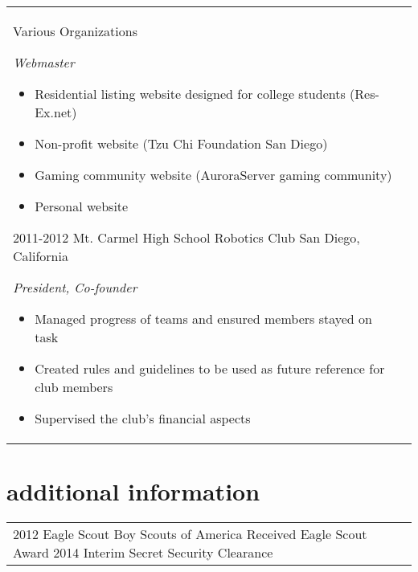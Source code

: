 \documentclass[print]{friggeri-cv} %
\makeatletter
\renewenvironment{entrylist}{%
	\par\begin{tabular*}{\textwidth}{@{\extracolsep{\fill}}ll}
	}{%
\end{tabular*}\par
}
\makeatother
\begin{document}
\begin{entrylist}
\entry
{ }
{Various Organizations}
{ }
{\emph{Webmaster}
\begin{itemize}
\item Residential listing website designed for college students (Res-Ex.net)
\item Non-profit website (Tzu Chi Foundation San Diego)
\item Gaming community website (AuroraServer gaming community)
\item Personal website
\end{itemize}}
\entry
{2011-2012}
{Mt. Carmel High School Robotics Club}
{San Diego, California}
{\emph{President, Co-founder}
\begin{itemize}
\item Managed progress of teams and ensured members stayed on task
\item Created rules and guidelines to be used as future reference for club members
\item Supervised the club's financial aspects
\end{itemize}}

\end{entrylist}


\section{additional information}

\begin{entrylist}
\entry
{2012}
{Eagle Scout}
{Boy Scouts of America}
{Received Eagle Scout Award}
\entry
{2014}
{Interim Secret Security Clearance}
{}
{}
\end{entrylist}


\end{document}
